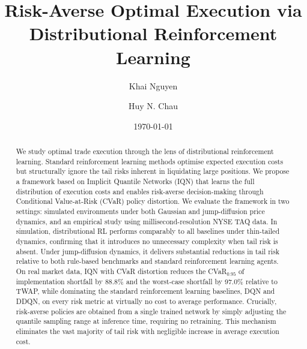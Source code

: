 \documentclass[11pt]{article}
\title{Risk-Averse Optimal Execution via Distributional Reinforcement Learning}
\author[1]{Khai Nguyen}
\author[1]{Huy N. Chau}
\affil[1]{Department of Mathematics, The University of Manchester}
\date{\today}
\begin{document}
\maketitle
\begin{abstract}
We study optimal trade execution through the lens of distributional 
reinforcement learning.  Standard reinforcement learning methods 
optimise expected execution costs but structurally ignore
the tail risks inherent in liquidating large positions.  We propose 
a framework based on Implicit Quantile Networks (IQN) that learns 
the full distribution of execution costs and enables risk-averse
decision-making through Conditional Value-at-Risk (CVaR) policy 
distortion.  We evaluate the framework in two settings: simulated environments 
under both Gaussian and jump-diffusion price dynamics, and an 
empirical study using millisecond-resolution NYSE TAQ data.  In 
simulation, distributional RL performs comparably to all baselines 
under thin-tailed dynamics, confirming that it introduces no 
unnecessary complexity when tail risk is absent. Under
jump-diffusion dynamics, it delivers substantial reductions in 
tail risk relative to both rule-based benchmarks and standard 
reinforcement learning agents.  On real market data, IQN with CVaR 
distortion reduces the CVaR$_{0.95}$ of implementation shortfall 
by 88.8\% and the worst-case shortfall by 97.0\% relative to TWAP, 
while dominating the standard reinforcement learning baselines, DQN and DDQN, on every risk
metric at virtually no cost to average performance.  Crucially, 
risk-averse policies are obtained from a single trained network by 
simply adjusting the quantile sampling range at inference time, 
requiring no retraining.  This mechanism eliminates the vast 
majority of tail risk with negligible increase in average 
execution cost.
\end{abstract}
\end{document}
